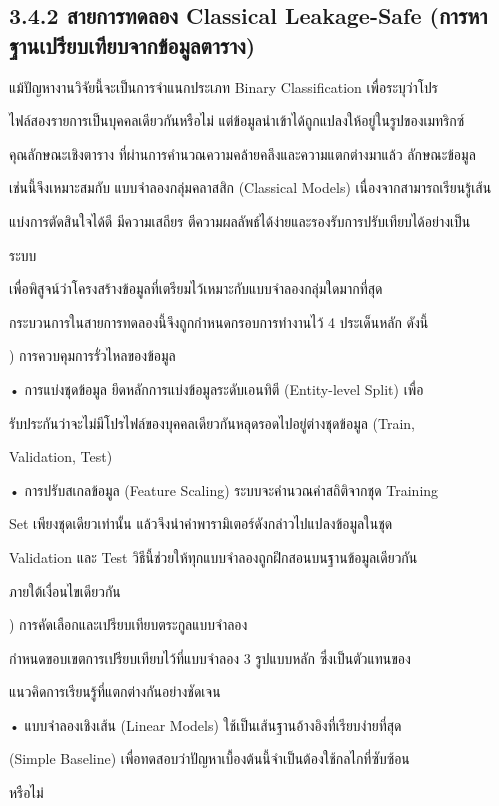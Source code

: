 \documentclass[12pt,a4paper]{report}
\begin{document}
\subsection*{3.4.2 สายการทดลอง Classical Leakage-Safe (การหาฐานเปรียบเทียบจากข้อมูลตาราง)}
แม้ปัญหางานวิจัยนี้จะเป็นการจำแนกประเภท Binary Classification เพื่อระบุว่าโปร\par
ไฟล์สองรายการเป็นบุคคลเดียวกันหรือไม่ แต่ข้อมูลนำเข้าได้ถูกแปลงให้อยู่ในรูปของเมทริกซ์\par
คุณลักษณะเชิงตาราง ที่ผ่านการคำนวณความคล้ายคลึงและความแตกต่างมาแล้ว ลักษณะข้อมูล\par
เช่นนี้จึงเหมาะสมกับ แบบจำลองกลุ่มคลาสสิก (Classical Models) เนื่องจากสามารถเรียนรู้เส้น\par
แบ่งการตัดสินใจได้ดี มีความเสถียร ตีความผลลัพธ์ได้ง่ายและรองรับการปรับเทียบได้อย่างเป็น\par
ระบบ\par
เพื่อพิสูจน์ว่าโครงสร้างข้อมูลที่เตรียมไว้เหมาะกับแบบจำลองกลุ่มใดมากที่สุด\par
กระบวนการในสายการทดลองนี้จึงถูกกำหนดกรอบการทำงานไว้ 4 ประเด็นหลัก ดังนี้\par
{}) การควบคุมการรั่วไหลของข้อมูล\par
\noindent • การแบ่งชุดข้อมูล ยึดหลักการแบ่งข้อมูลระดับเอนทิตี (Entity-level Split) เพื่อ\par
รับประกันว่าจะไม่มีโปรไฟล์ของบุคคลเดียวกันหลุดรอดไปอยู่ต่างชุดข้อมูล (Train,\par
Validation, Test)\par
\noindent • การปรับสเกลข้อมูล (Feature Scaling) ระบบจะคำนวณค่าสถิติจากชุด Training\par
Set เพียงชุดเดียวเท่านั้น แล้วจึงนำค่าพารามิเตอร์ดังกล่าวไปแปลงข้อมูลในชุด\par
Validation และ Test วิธีนี้ช่วยให้ทุกแบบจำลองถูกฝึกสอนบนฐานข้อมูลเดียวกัน\par
ภายใต้เงื่อนไขเดียวกัน\par
{}) การคัดเลือกและเปรียบเทียบตระกูลแบบจำลอง\par
กำหนดขอบเขตการเปรียบเทียบไว้ที่แบบจำลอง 3 รูปแบบหลัก ซึ่งเป็นตัวแทนของ\par
แนวคิดการเรียนรู้ที่แตกต่างกันอย่างชัดเจน\par
\noindent • แบบจำลองเชิงเส้น (Linear Models) ใช้เป็นเส้นฐานอ้างอิงที่เรียบง่ายที่สุด\par
(Simple Baseline) เพื่อทดสอบว่าปัญหาเบื้องต้นนี้จำเป็นต้องใช้กลไกที่ซับซ้อน\par
หรือไม่\par
\end{document}
